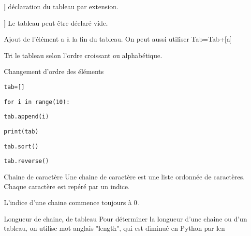 \begin{minipage}[t]{0.49\linewidth}
\begin{Syn}
\begin{description}[leftmargin=*]
\item[tab=['1','a']] déclaration du tableau par extension.
\item[tab=[]] Le tableau peut être déclaré vide.  
\item[tab.append(a)] Ajout de l'élément a à la fin du tableau. On peut aussi utiliser Tab=Tab+[a]
\item[tab.sort()] Tri le tableau selon l'ordre croissant ou alphabétique.
\item[tab.reverse()] Changement d'ordre des éléments
\end{description}
\end{Syn}
\end{minipage}
\hfill
\begin{minipage}[t]{0.49\linewidth}
\begin{Cod}
\begin{description}[leftmargin=*]
\item \texttt{tab=[]}
\item \texttt{{\color{orange}for} i {\color{orange}in}  {\color{violet}range}(10):}
\item \hspace{0,4cm}\texttt{tab.append(i)}
\item \hspace{0,4cm}\texttt{{\color{violet}print}(tab)}
\item \texttt{tab.sort()}
\item \texttt{tab.reverse()}
\end{description}

\end{Cod}
\end{minipage}




\begin{DefT}{Chaine de caractère}
Une chaine de caractère est une liste ordonnée de caractères. Chaque caractère est repéré par un indice.

L'indice d'une chaine commence toujours à 0.
\end{DefT}


\begin{DefT}{Longueur de chaine, de tableau} 
Pour déterminer la longueur d'une chaine ou d'un tableau, on utilise mot anglais "length", qui est diminué en Python par {\color{violet}len}
\end{DefT}


